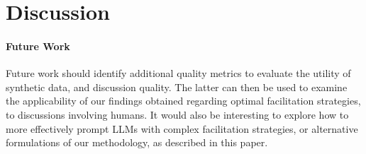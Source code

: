 %
\section{Discussion}
\paragraph{Future Work} Future work should identify additional quality metrics to evaluate the utility of synthetic data, and discussion quality. The latter can then be used to examine the applicability of our findings obtained regarding optimal facilitation strategies, to discussions involving humans. It would also be interesting to explore how to more effectively prompt LLMs with complex facilitation strategies, or alternative formulations of our methodology, as described in this paper.
